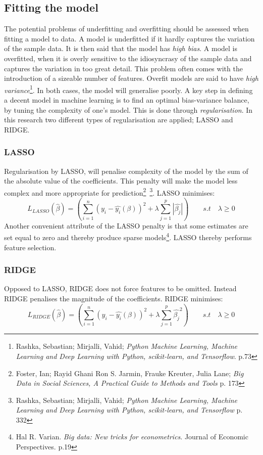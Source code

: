 \documentclass[12pt,a4paper]{article}
\begin{document}
\subsection{Fitting the model}
The potential problems of underfitting and overfitting should be assessed when fitting a model to data. A model is underfitted if it hardly captures the variation of the sample data. It is then said that the model has \textit{high bias}. A model is overfitted, when it is overly sensitive to the idiosyncrasy of the sample data and captures the variation in too great detail. This problem often comes with the introduction of a sizeable number of features. Overfit models are said to have \textit{high variance}\footnote{Rashka, Sebastian; Mirjalli, Vahid; \textit{Python Machine Learning, Machine Learning and Deep Learning with Python, scikit-learn, and Tensorflow}. p.73}. In both cases, the model will generalise poorly. A key step in defining a decent model in machine learning is to find an optimal bias-variance balance, by tuning the complexity of one's model. This is done through \textit{regularisation}. In this research two different types of regularisation are applied; LASSO and RIDGE.

\subsubsection{LASSO}
Regularisation by LASSO, will penalise complexity of the model by the sum of the absolute value of the coefficients. This penalty will make the model less complex and more appropriate for prediction\footnote{Foster, Ian; Rayid Ghani Ron S. Jarmin, Frauke Kreuter, Julia Lane; \textit{Big Data in Social Sciences, A Practical Guide to Methods and Tools} p. 173}\, \footnote{Rashka, Sebastian; Mirjalli, Vahid; \textit{Python Machine Learning, Machine Learning and Deep Learning with Python, scikit-learn, and Tensorflow} p. 332}.
\newline LASSO minimises: $$L_{LASSO}(\hat{\beta}) = \left(\sum_{i=1}^{n} (y_i-\hat{y_i}(\beta))^2+\lambda\sum_{j=1}^{p}|\hat{\beta_j}|\right) \qquad s.t \quad \lambda \geq 0 $$
Another convenient attribute of the LASSO penalty is that some estimates are set equal to zero and thereby produce sparse models\footnote{Hal R. Varian. \textit{Big data: New tricks for econometrics}. Journal of Economic Perspectives. p.19}. LASSO thereby performs feature selection.   
\subsubsection{RIDGE}
Opposed to LASSO, RIDGE does not force features to be omitted. Instead RIDGE penalises the magnitude of the coefficients. RIDGE minimises:
$$L_{RIDGE}(\hat{\beta}) = \left(\sum_{i=1}^{n} (y_i-\hat{y_i}(\beta))^2+\lambda\sum_{j=1}^{p}\hat{\beta_j}^2\right) \qquad s.t \quad \lambda \geq 0 $$ 
\end{document}

